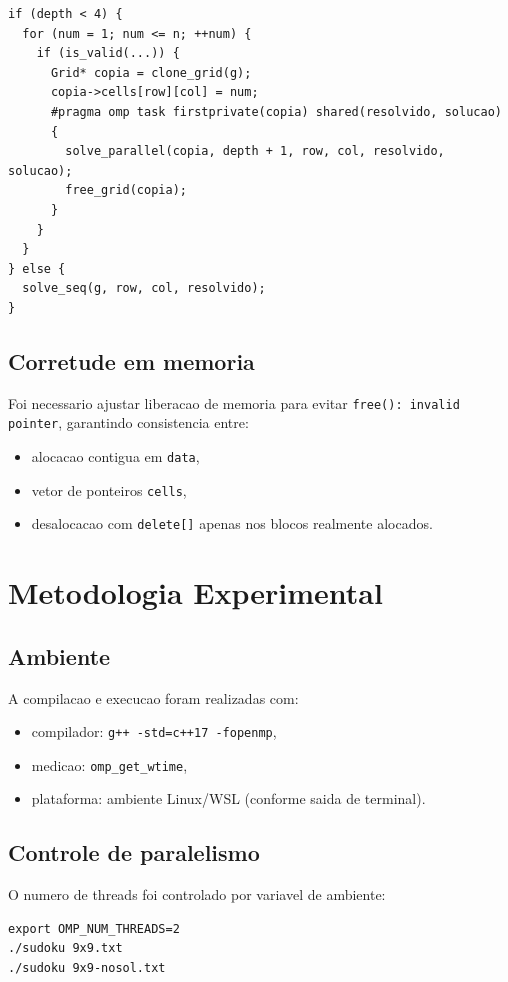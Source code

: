 \documentclass[11pt,a4paper]{article}
\begin{document}
\begin{lstlisting}[style=cppstyle,caption={Esqueleto da estrategia paralela}]
if (depth < 4) {
  for (num = 1; num <= n; ++num) {
    if (is_valid(...)) {
      Grid* copia = clone_grid(g);
      copia->cells[row][col] = num;
      #pragma omp task firstprivate(copia) shared(resolvido, solucao)
      {
        solve_parallel(copia, depth + 1, row, col, resolvido, solucao);
        free_grid(copia);
      }
    }
  }
} else {
  solve_seq(g, row, col, resolvido);
}
\end{lstlisting}

\subsection{Corretude em memoria}
Foi necessario ajustar liberacao de memoria para evitar \texttt{free(): invalid pointer}, garantindo consistencia entre:
\begin{itemize}
  \item alocacao contigua em \texttt{data},
  \item vetor de ponteiros \texttt{cells},
  \item desalocacao com \texttt{delete[]} apenas nos blocos realmente alocados.
\end{itemize}

\section{Metodologia Experimental}
\subsection{Ambiente}
A compilacao e execucao foram realizadas com:
\begin{itemize}
  \item compilador: \texttt{g++ -std=c++17 -fopenmp},
  \item medicao: \texttt{omp\_get\_wtime},
  \item plataforma: ambiente Linux/WSL (conforme saida de terminal).
\end{itemize}

\subsection{Controle de paralelismo}
O numero de threads foi controlado por variavel de ambiente:
\begin{lstlisting}[basicstyle=\ttfamily\small,frame=single]
export OMP_NUM_THREADS=2
./sudoku 9x9.txt
./sudoku 9x9-nosol.txt
\end{lstlisting}
\end{document}
